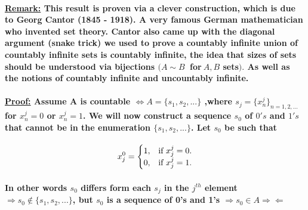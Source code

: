 \documentclass[10pt,a4paper]{article}
\begin{document}
\paragraph{\underline{Remark:} This result is proven via a clever construction, which is due to Georg Cantor (1845 - 1918). A very famous German mathematician who invented set theory. Cantor also came up with the diagonal argument (snake trick) we used to prove a countably infinite union of countably infinite sets is countably infinite, the idea that sizes of sets should be understood via bijections $(A \sim B \ $ for$ \ A,B $ sets$).$ As well as the notions of countably infinite and uncountably infinite.}

\paragraph{\underline{Proof:} Assume A is countable $\iff A = \lbrace s_{1},s_{2},...\rbrace$ ,where $s_{j} = \lbrace x_{n}^{j}\rbrace _{n = 1,2,...}$ for $x_{n}^{j} = 0$ or $x_{n}^{j} = 1$. We will now construct a sequence $s_{0}$ of $0's$ and $1's$ that cannot be in the enumeration $\lbrace s_{1},s_{2},...\rbrace$. Let $s_{0}$ be such that 
}\normalsize
\begin{equation}
 	 x_{j}^{0}=\begin{cases}
    1, & \text{if $x_{j}^{j} = 0$}.\\
    0, & \text{if $ x_{j}^{j} = 1 $}.
  \end{cases}
\end{equation}
\paragraph{In other words $s_{0}$ differs form each $s_{j}$ in the $j^{th}$ element \newline $\Longrightarrow s_{0} \notin \lbrace s_{1}, s_{2},... \rbrace$, but $s_{0}$ is a sequence of 0's and 1's $\Rightarrow s_{0} \in A \Rightarrow\!\Leftarrow$}
\end{document}
